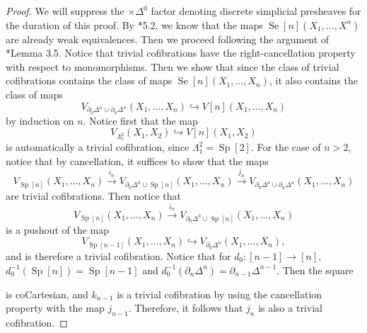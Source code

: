 \documentclass[leqno]{article}
\numberwithin{equation}{subsection}
\theoremstyle{plain}   %
\theoremstyle{remark}
\theoremstyle{plain}
\begin{document}
\begin{proof}
	We will suppress the \(\times \Delta^0\) factor denoting discrete simplicial presheaves for the duration of this proof.  By \cite{rezk-theta-n-spaces}*{5.2}, we know that the maps \(\operatorname{Se}[n](X_1,\dots,X^n)\) are already weak equivalences.  Then we proceed following the argument of \cite{jtsegal}*{Lemma 3.5}.  Notice that trivial cofibrations have the right-cancellation property with respect to monomorphisms.  Then we show that since the class of trivial cofibrations contains the class of maps \(\operatorname{Se}[n](X_1,\dots,X_n)\), it also contains the class of maps 
	\[V_{\partial_0 \Delta^n \cup \partial_n \Delta^n}(X_1,\dots,X_n)\hookrightarrow V[n](X_1,\dots,X_n)\] by induction on \(n\).  Notice first that the map
	\[V_{\Lambda^2_1}(X_1,X_2)\hookrightarrow V[n](X_1,X_2)\]
	is automatically a trivial cofibration, since \(\Lambda^2_1=\operatorname{Sp}[2]\).
	For the case of \(n>2\), notice that by cancellation, it suffices to show that the maps
	\[V_{\operatorname{Sp}[n]}(X_1,\dots, X_n) \xrightarrow{i_n} V_{\partial_0\Delta^n \cup \operatorname{Sp}[n]}(X_1,\dots, X_n) \xrightarrow{j_n} V_{\partial_0 \Delta^n \cup \partial_n \Delta^n}(X_1,\dots,X_n)\]
	are trivial cofibrations.
	Then notice that 
	\[V_{\operatorname{Sp}[n]}(X_1,\dots,X_n) \xrightarrow{i_n} V_{\partial_0 \Delta^n\cup \operatorname{Sp}[n]}(X_1,\dots,X_n)\]
	is a pushout of the map 
	\[V_{\operatorname{Sp}[n-1]}(X_1,\dots,X_n) \hookrightarrow V_{\partial_0 \Delta^n}(X_1,\dots,X_n),\]
	and is therefore a trivial cofibration.  
	Notice that for \(d_0: [n-1] \to [n]\), \(d_0^{-1}(\operatorname{Sp}[n]) = \operatorname{Sp}[n-1]\) and \(d_0^{-1}(\partial_n\Delta^n) = \partial_{n-1}\Delta^{n-1}\).  Then the square
	\begin{center}
	\end{center}
	is coCartesian, and \(k_{n-1}\) is a trivial cofibration by using the cancellation property with the map \(j_{n-1}\).
	Therefore, it follows that \(j_n\) is also a trivial cofibration. 


\end{proof}
\end{document}
